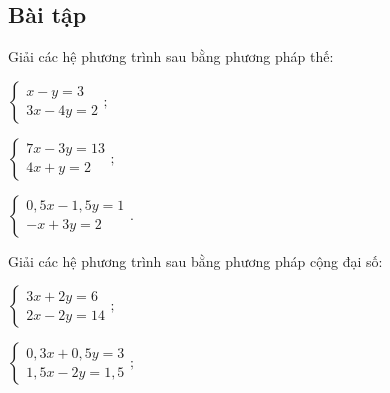 \begin{exercises}
    \subsection{Bài tập}

    \begin{questions}[resume=SGK]
        \item Giải các hệ phương trình sau bằng phương pháp thế:
        \begin{questions}
            \item $\begin{cases}x-y=3\\3x-4y=2\end{cases};$

            \answerline
            \answerline
            \answerline

            \item $\begin{cases}7x-3y=13\\4x+y=2\end{cases};$

            \answerline
            \answerline
            \answerline

            \item $\begin{cases}0{,}5x-1{,}5y=1\\-x+3y=2\end{cases}.$

            \answerline
            \answerline
            \answerline
        \end{questions}

        \item Giải các hệ phương trình sau bằng phương pháp cộng đại số:
        \begin{questions}
            \item $\begin{cases}3x+2y=6\\2x-2y=14\end{cases};$

            \answerline
            \answerline
            \answerline

            \item $\begin{cases}0{,}3x+0{,}5y=3\\1{,}5x-2y=1{,}5\end{cases};$

            \answerline
            \answerline
            \answerline


\end{questions}
\end{questions}
\end{exercises}
